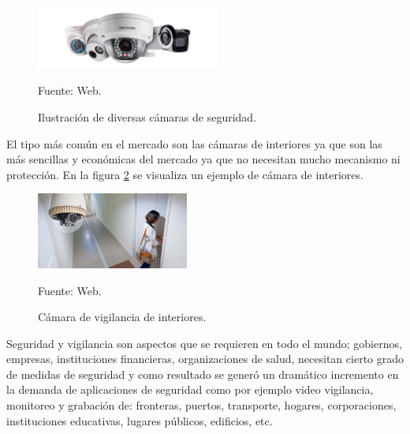 \begin{figure}[H]
    \begin{center}
        \includegraphics[width=6cm]{img/capitulo_3/camaras.jpg}
        \caption{Ilustración de diversas cámaras de seguridad.}
        Fuente: Web.
        \label{fig:camaras}
    \end{center}
\end{figure}
El tipo más común en el mercado son las cámaras de interiores ya que son las más sencillas y económicas del mercado ya que no necesitan mucho mecanismo ni protección. En la figura \ref{fig:camara} se visualiza un ejemplo de cámara de interiores.
\begin{figure}[H]
    \begin{center}
        \includegraphics[width=5cm]{img/capitulo_3/camara_de_interiores.jpg}
        \caption{Cámara de vigilancia de interiores.}
        Fuente: Web.
        \label{fig:camara}
    \end{center}
\end{figure}

Seguridad y vigilancia son aspectos que se requieren en todo el mundo; gobiernos, empresas, instituciones financieras, organizaciones de salud, necesitan cierto grado de medidas de seguridad y como resultado se generó un dramático incremento en la demanda de aplicaciones de seguridad como por ejemplo video vigilancia, monitoreo y grabación de: fronteras, puertos, transporte, hogares, corporaciones, instituciones educativas, lugares públicos, edificios, etc.\\



